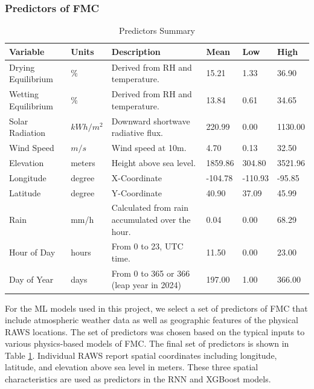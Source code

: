 \documentclass[fire,article,submit,pdftex,moreauthors]{Definitions/mdpi}
\begin{document}
\subsubsection{Predictors of FMC}
\label{sec:preds}
\begin{table}[tb]
\caption{Predictors Summary\label{tab:all_vars}}
\small
\begin{tabularx}{\textwidth}{l l p{4cm} p{1cm} p{1cm} p{1cm}}
\toprule
\textbf{Variable} & \textbf{Units} & \textbf{Description} & \textbf{Mean} & \textbf{Low} & \textbf{High} \\
\midrule
Drying Equilibrium & $\%$ & Derived from RH and temperature. & 15.21 & 1.33 & 36.90 \\
\midrule
Wetting Equilibrium & $\%$ & Derived from RH and temperature. & 13.84 & 0.61 & 34.65 \\
\midrule
Solar Radiation & $kWh/m^2$ & Downward shortwave radiative flux. & 220.99 & 0.00 & 1130.00 \\
\midrule
Wind Speed & $m/s$ & Wind speed at 10m. & 4.70 & 0.13 & 32.50 \\
\midrule
Elevation & meters & Height above sea level. & 1859.86 & 304.80 & 3521.96 \\
\midrule
Longitude & degree & X-Coordinate & -104.78 & -110.93 & -95.85 \\
\midrule
Latitude & degree & Y-Coordinate & 40.90 & 37.09 & 45.99 \\
\midrule
Rain & mm/h & Calculated from rain accumulated over the hour. & 0.04 & 0.00 & 68.29 \\
\midrule
Hour of Day & hours & From 0 to 23, UTC time. & 11.50 & 0.00 & 23.00 \\
\midrule
Day of Year & days & From 0 to 365 or 366 (leap year in 2024) & 197.00 & 1.00 & 366.00 \\
\bottomrule
\end{tabularx}
\end{table}

For the ML models used in this project, we select a set of predictors of FMC that include atmospheric weather data as well as geographic features of the physical RAWS locations. The set of predictors was chosen based on the typical inputs to various physics-based models of FMC. The final set of predictors is shown in Table \ref{tab:all_vars}. Individual RAWS report spatial coordinates including longitude, latitude, and elevation above sea level in meters. These three spatial characteristics are used as predictors in the RNN and XGBoost models. 
\end{document}
